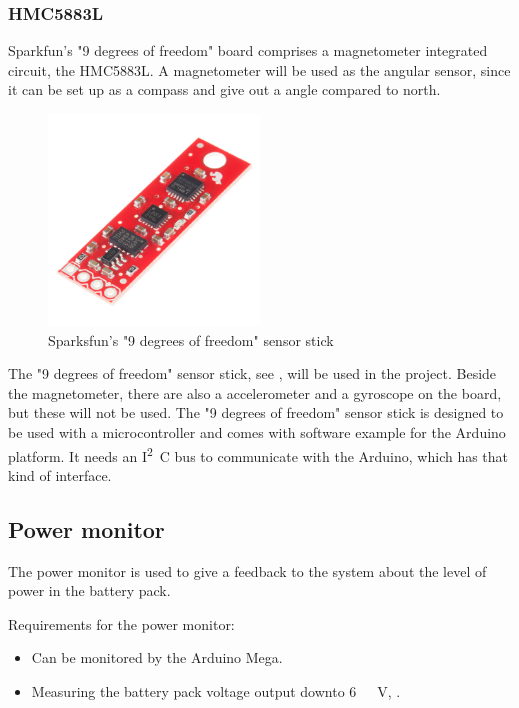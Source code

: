 \subsubsection{HMC5883L}
Sparkfun's "9 degrees of freedom" board\cite{Sparkfun9D0F} comprises a magnetometer integrated circuit, the HMC5883L. A magnetometer will be used as the angular sensor, since it can be set up as a compass and give out a angle compared to north. 

\begin{figure}[H]
	\centering
	\includegraphics[width=0.50\textwidth]{figures/NineDegree.jpg}
		\caption{Sparksfun's "9 degrees of freedom" sensor stick\cite{Sparkfun9D0F} } 
	\label{NineDegree}
\end{figure}\vspace{-5mm}

The "9 degrees of freedom" sensor stick, see , will be used in the project. Beside the magnetometer, there are also a accelerometer and a gyroscope on the board, but these will not be used. The "9 degrees of freedom" sensor stick is designed to be used with a microcontroller and comes with software example for the Arduino platform. It needs an  \si{I^2C} bus to communicate with the Arduino, which has that kind of interface.


\subsection{Power monitor}
The power monitor is used to give a feedback to the system about the level of power in the battery pack.

Requirements for the power monitor:
\begin{itemize}
\item Can be monitored by the Arduino Mega.
\item Measuring the battery pack voltage output downto \si{6\ V}, .
\end{itemize}

